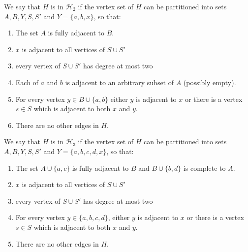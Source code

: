 \documentclass[a4paper,UKenglish,cleveref, autoref, thm-restate]{lipics-v2021}
\newcommand{\cH}{\mathcal{H}}
\begin{document}
We say that $H$ is in $\cH_2$ if the vertex set of $H$ can be partitioned into sets $A,B,Y,S,S'$ and $Y=\{a,b,x\}$, so that:
\begin{enumerate}[(1)]
    \item The set $A$ is fully adjacent to $B$.
    \item $x$ is adjacent to all vertices of $S\cup S'$
    \item every vertex of $S\cup S'$ has degree at most two
\item Each of $a$ and $b$ is adjacent to an arbitrary subset of $A$ (possibly empty).
    \item For every vertex $y\in B\cup\{a,b\}$ either $y$ is adjacent to $x$ or there is a vertex $s\in S$ which is adjacent to both $x$ and $y$.
    \item There are no other edges in $H$.
\end{enumerate}

We say that $H$ is in $\cH_3$ if the vertex set of $H$ can be partitioned into sets $A,B,Y,S,S'$ and $Y=\{a,b,c,d,x\}$, so that:
\begin{enumerate}[(1)]
    \item The set $A\cup\{a,c\}$ is fully adjacent to $B$ and $B\cup \{b,d\}$ is complete to $A$.
    \item $x$ is adjacent to all vertices of $S\cup S'$
    \item every vertex of $S\cup S'$ has degree at most two
    \item For every vertex $y\in \{a,b,c,d\}$, either $y$ is adjacent to $x$ or there is a vertex $s\in S$ which is adjacent to both $x$ and $y$.
    \item There are no other edges in $H$.
\end{enumerate}
\end{document}
